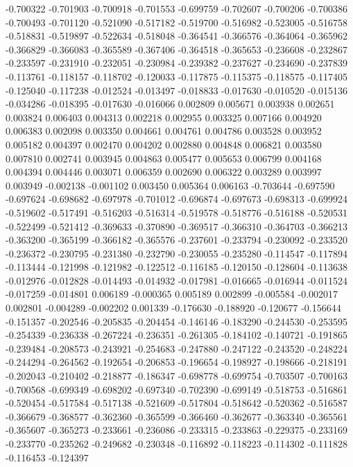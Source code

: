 -0.700322
-0.701903
-0.700918
-0.701553
-0.699759
-0.702607
-0.700206
-0.700386
-0.700493
-0.701120
-0.521090
-0.517182
-0.519700
-0.516982
-0.523005
-0.516758
-0.518831
-0.519897
-0.522634
-0.518048
-0.364541
-0.366576
-0.364064
-0.365962
-0.366829
-0.366083
-0.365589
-0.367406
-0.364518
-0.365653
-0.236608
-0.232867
-0.233597
-0.231910
-0.232051
-0.230984
-0.239382
-0.237627
-0.234690
-0.237839
-0.113761
-0.118157
-0.118702
-0.120033
-0.117875
-0.115375
-0.118575
-0.117405
-0.125040
-0.117238
-0.012524
-0.013497
-0.018833
-0.017630
-0.010520
-0.015136
-0.034286
-0.018395
-0.017630
-0.016066
0.002809
0.005671
0.003938
0.002651
0.003824
0.006403
0.004313
0.002218
0.002955
0.003325
0.007166
0.004920
0.006383
0.002098
0.003350
0.004661
0.004761
0.004786
0.003528
0.003952
0.005182
0.004397
0.002470
0.004202
0.002880
0.004848
0.006821
0.003580
0.007810
0.002741
0.003945
0.004863
0.005477
0.005653
0.006799
0.004168
0.004394
0.004446
0.003071
0.006359
0.002690
0.006322
0.003289
0.003997
0.003949
-0.002138
-0.001102
0.003450
0.005364
0.006163
-0.703644
-0.697590
-0.697624
-0.698682
-0.697978
-0.701012
-0.696874
-0.697673
-0.698313
-0.699924
-0.519602
-0.517491
-0.516203
-0.516314
-0.519578
-0.518776
-0.516188
-0.520531
-0.522499
-0.521412
-0.369633
-0.370890
-0.369517
-0.366310
-0.364703
-0.366213
-0.363200
-0.365199
-0.366182
-0.365576
-0.237601
-0.233794
-0.230092
-0.233520
-0.236372
-0.230795
-0.231380
-0.232790
-0.230055
-0.235280
-0.114547
-0.117894
-0.113444
-0.121998
-0.121982
-0.122512
-0.116185
-0.120150
-0.128604
-0.113638
-0.012976
-0.012828
-0.014493
-0.014932
-0.017981
-0.016665
-0.016944
-0.011524
-0.017259
-0.014801
0.006189
-0.000365
0.005189
0.002899
-0.005584
-0.002017
0.002801
-0.004289
-0.002202
0.001339
-0.176630
-0.188920
-0.120677
-0.156644
-0.151357
-0.202546
-0.205835
-0.204454
-0.146146
-0.183290
-0.244530
-0.253595
-0.254339
-0.236338
-0.267224
-0.236351
-0.261305
-0.184102
-0.140721
-0.191865
-0.239484
-0.208573
-0.243921
-0.254683
-0.247880
-0.247122
-0.243520
-0.248224
-0.244294
-0.264562
-0.192654
-0.206853
-0.196654
-0.198927
-0.198666
-0.218191
-0.202043
-0.210402
-0.218877
-0.186347
-0.698778
-0.699754
-0.703507
-0.700163
-0.700568
-0.699349
-0.698202
-0.697340
-0.702390
-0.699149
-0.518753
-0.516861
-0.520454
-0.517584
-0.517138
-0.521609
-0.517804
-0.518642
-0.520362
-0.516587
-0.366679
-0.368577
-0.362360
-0.365599
-0.366460
-0.362677
-0.363340
-0.365561
-0.365607
-0.365273
-0.233661
-0.236086
-0.233315
-0.233863
-0.229375
-0.233169
-0.233770
-0.235262
-0.249682
-0.230348
-0.116892
-0.118223
-0.114302
-0.111828
-0.116453
-0.124397
